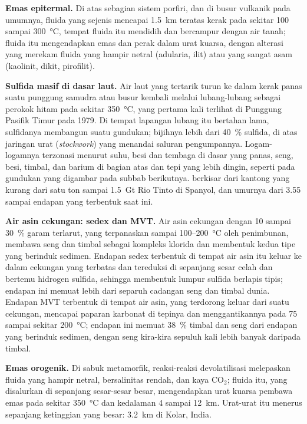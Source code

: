 \textbf{Emas epitermal.} Di atas sebagian sistem porfiri, dan di busur vulkanik pada umumnya, fluida yang
sejenis mencapai \qty{1.5}{km} teratas kerak pada sekitar 100 sampai \qty{300}{\celsius},
tempat fluida itu mendidih dan bercampur dengan air tanah; fluida itu mengendapkan emas dan perak dalam urat kuarsa, dengan
alterasi yang merekam fluida yang hampir netral (adularia, ilit) atau yang sangat asam (kaolinit,
dikit, pirofilit).

\textbf{Sulfida masif di dasar laut.} Air laut yang tertarik turun ke dalam kerak panas suatu punggung samudra atau
busur kembali melalui lubang-lubang sebagai perokok hitam pada sekitar \qty{350}{\celsius}, yang pertama kali terlihat di Punggung
Pasifik Timur pada 1979. Di tempat lapangan lubang itu bertahan lama, sulfidanya membangun suatu gundukan; bijihnya lebih dari
\qty{40}{\percent} sulfida, di atas jaringan urat (\textit{stockwork}) yang menandai saluran pengumpannya. Logam-logamnya terzonasi
menurut suhu, besi dan tembaga di dasar yang panas, seng, besi, timbal, dan barium di bagian atas dan
tepi yang lebih dingin, seperti pada gundukan yang digambar pada subbab berikutnya.  berkisar dari kantong yang kurang dari satu ton sampai \qty{1.5}{Gt} Rio Tinto di Spanyol, dan
umurnya dari \qty{3.55}{\Ga} sampai endapan yang terbentuk saat ini.

\textbf{Air asin cekungan: sedex dan MVT.} Air asin cekungan dengan 10 sampai \qty{30}{\percent} garam terlarut,
yang terpanaskan sampai 100--\qty{200}{\celsius} oleh penimbunan, membawa seng dan timbal sebagai kompleks klorida dan membentuk
kedua tipe yang berinduk sedimen. Endapan sedex terbentuk di tempat air asin itu keluar ke dalam cekungan yang terbatas dan tereduksi
di sepanjang sesar celah dan bertemu hidrogen sulfida, sehingga membentuk lumpur sulfida berlapis tipis; endapan ini memuat lebih
dari separuh cadangan seng dan timbal dunia. Endapan MVT terbentuk di tempat air asin, yang terdorong keluar dari suatu
cekungan, mencapai paparan karbonat di tepinya dan menggantikannya pada 75 sampai sekitar
\qty{200}{\celsius}; endapan ini memuat \qty{38}{\percent} timbal dan seng dari endapan yang berinduk sedimen,
dengan seng kira-kira sepuluh kali lebih banyak daripada timbal.

\textbf{Emas orogenik.} Di sabuk metamorfik, reaksi-reaksi devolatilisasi melepaskan fluida yang hampir netral,
bersalinitas rendah, dan kaya CO$_2$; fluida itu, yang disalurkan di sepanjang sesar-sesar besar, mengendapkan urat kuarsa
pembawa emas pada sekitar \qty{350}{\celsius} dan kedalaman 4 sampai \qty{12}{km}. Urat-urat itu menerus sepanjang
ketinggian yang besar: \qty{3.2}{km} di Kolar, India.

